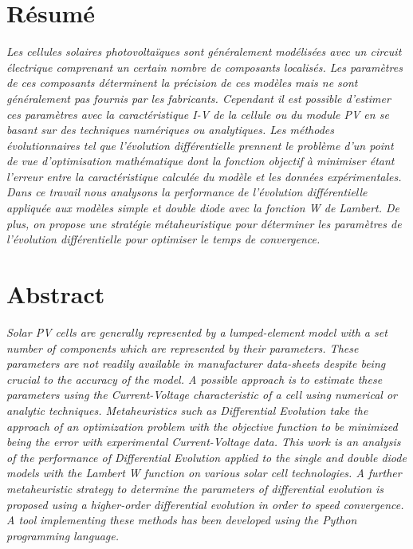 \section*{Résumé}
\textit{Les cellules solaires photovoltaïques sont généralement modélisées avec un circuit électrique comprenant un certain nombre de composants localisés. Les paramètres de ces composants déterminent la précision de ces modèles mais ne sont généralement pas fournis par les fabricants. Cependant il est possible d'estimer ces paramètres avec la caractéristique I-V de la cellule ou du module PV en se basant sur des techniques numériques ou analytiques. Les méthodes évolutionnaires tel que l'évolution différentielle prennent le problème d'un point de vue d'optimisation mathématique dont la fonction objectif à minimiser étant l'erreur entre la caractéristique calculée du modèle et les données expérimentales. Dans ce travail nous analysons la performance de l'évolution différentielle appliquée aux modèles simple et double diode avec la fonction W de Lambert. De plus, on propose une stratégie métaheuristique pour déterminer les paramètres de l'évolution différentielle pour optimiser le temps de convergence.
}
\section*{Abstract}
\textit{Solar PV cells are generally represented by a lumped-element model with a set number of components which are represented by their parameters. These parameters are not readily available in manufacturer data-sheets despite being crucial to the accuracy of the model. A possible approach is to estimate these parameters using the Current-Voltage characteristic of a cell using numerical or analytic techniques. Metaheuristics such as Differential Evolution take the approach of an optimization problem with the objective function to be minimized being the error with experimental Current-Voltage data. This work is an analysis of the performance of Differential Evolution applied to the single and double diode models with the Lambert W function on various solar cell technologies. A further metaheuristic strategy to determine the parameters of differential evolution is proposed using a higher-order differential evolution in order to speed convergence. A tool implementing these methods has been developed using the Python programming language.}


\printnomenclature


